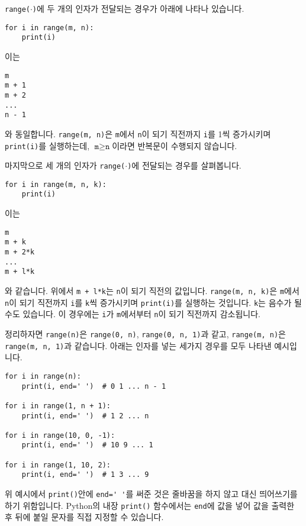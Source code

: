 \documentclass[../main.tex]{subfiles}
\begin{document}
\texttt{range($\cdot$)}에 두 개의 인자가 전달되는 경우가 아래에 나타나 있습니다.
\begin{verbatim}
for i in range(m, n):
    print(i)
\end{verbatim}
이는 
\begin{verbatim}
m
m + 1
m + 2
...
n - 1
\end{verbatim}
와 동일합니다.
\texttt{range(m, n)}은 \texttt{m}에서 \texttt{n}이 되기 직전까지 \texttt{i}를
1씩 증가시키며 \texttt{print(i)}를 실행하는데, $\texttt{m} \geq \texttt{n}$이라면 반복문이 수행되지 않습니다.

마지막으로 세 개의 인자가 \texttt{range($\cdot$)}에 전달되는 경우를 살펴봅니다.
\begin{verbatim}
for i in range(m, n, k):
    print(i)
\end{verbatim}
이는
\begin{verbatim}
m
m + k
m + 2*k
...
m + l*k
\end{verbatim}
와 같습니다.
위에서 \texttt{m + l*k}는 \texttt{n}이 되기 직전의 값입니다.
\texttt{range(m, n, k)}은 \texttt{m}에서 \texttt{n}이 되기 직전까지
\texttt{i}를 \texttt{k}씩 증가시키며 \texttt{print(i)}를 실행하는 것입니다.
\texttt{k}는 음수가 될 수도 있습니다.
이 경우에는 \texttt{i}가 \texttt{m}에서부터 \texttt{n}이 되기 직전까지 감소됩니다.

정리하자면 \texttt{range(n)}은 \texttt{range(0, n)}, \texttt{range(0, n, 1)}과 같고, \texttt{range(m, n)}은 \texttt{range(m, n, 1)}과 같습니다.
아래는 인자를 넣는 세가지 경우를 모두 나타낸 예시입니다.
\begin{verbatim}
for i in range(n):
    print(i, end=' ')  # 0 1 ... n - 1

for i in range(1, n + 1):
    print(i, end=' ')  # 1 2 ... n

for i in range(10, 0, -1):
    print(i, end=' ')  # 10 9 ... 1

for i in range(1, 10, 2):
    print(i, end=' ')  # 1 3 ... 9
\end{verbatim}
위 예시에서 \verb|print()|안에 \verb|end=' '|를 써준 것은 줄바꿈을 하지 않고
대신 띄어쓰기를 하기 위함입니다.
Python의 내장 \verb|print()| 함수에서는 \verb|end|에 값을 넣어 값을 출력한 후
뒤에 붙일 문자를 직접 지정할 수 있습니다.
\end{document}
